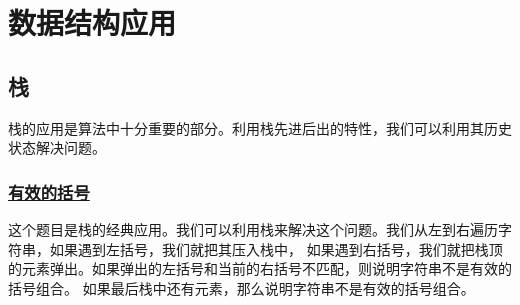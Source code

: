 \documentclass[../../main.tex]{subfiles}
\begin{document}
\setchapterpreamble[u]{\margintoc}

\chapter{数据结构应用}

\section{栈}

栈的应用是算法中十分重要的部分。利用栈先进后出的特性，我们可以利用其历史状态解决问题。

\subsection{\href{https://leetcode-cn.com/problems/valid-parentheses/}{有效的括号}}

这个题目是栈的经典应用。我们可以利用栈来解决这个问题。我们从左到右遍历字符串，如果遇到左括号，我们就把其压入栈中，
如果遇到右括号，我们就把栈顶的元素弹出。如果弹出的左括号和当前的右括号不匹配，则说明字符串不是有效的括号组合。
如果最后栈中还有元素，那么说明字符串不是有效的括号组合。


\end{document}
